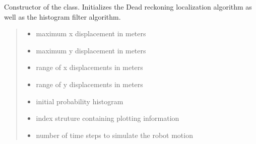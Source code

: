 \documentclass[letterpaper,10pt,english]{sphinxmanual}
\begin{document}
\begin{fulllineitems}
\begin{fulllineitems}
\label{\detokenize{GridLocalization:GL_3DOFDifferentialDrive.GL_3DOFDifferentialDrive.__init__}}
\pysigstartsignatures
{}
\pysigstopsignatures
\sphinxAtStartPar
Constructor of the  class. Initializes the Dead reckoning localization algorithm as well as the histogram filter algorithm.
\begin{quote}\begin{description}
\begin{itemize}
\item {} 
\sphinxAtStartPar
{} \textendash{} maximum x displacement in meters

\item {} 
\sphinxAtStartPar
{} \textendash{} maximum y displacement in meters

\item {} 
\sphinxAtStartPar
{} \textendash{} range of x displacements in meters

\item {} 
\sphinxAtStartPar
{} \textendash{} range of y displacements in meters

\item {} 
\sphinxAtStartPar
{} \textendash{} initial probability histogram

\item {} 
\sphinxAtStartPar
{} \textendash{} index struture containing plotting information

\item {} 
\sphinxAtStartPar
{} \textendash{} number of time steps to simulate the robot motion


\end{itemize}
\end{description}
\end{quote}
\end{fulllineitems}
\end{fulllineitems}
\end{document}
